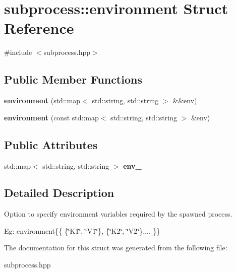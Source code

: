 \hypertarget{structsubprocess_1_1environment}{}\section{subprocess\+:\+:environment Struct Reference}
\label{structsubprocess_1_1environment}


{\ttfamily \#include $<$subprocess.\+hpp$>$}

\subsection*{Public Member Functions}
\begin{DoxyCompactItemize}
\item 
\mbox{\label{structsubprocess_1_1environment_af9a4b90871e4e6fd3a9249b9d20bdaff}} 
{\bfseries environment} (std\+::map$<$ std\+::string, std\+::string $>$ \&\&env)
\item 
\mbox{\label{structsubprocess_1_1environment_a3784ad2131faf4f4a41bfff7745c6b1b}} 
{\bfseries environment} (const std\+::map$<$ std\+::string, std\+::string $>$ \&env)
\end{DoxyCompactItemize}
\subsection*{Public Attributes}
\begin{DoxyCompactItemize}
\item 
\mbox{\label{structsubprocess_1_1environment_a93cbf888bcc52d15f1e06d1f7995f89c}} 
std\+::map$<$ std\+::string, std\+::string $>$ {\bfseries env\+\_\+}
\end{DoxyCompactItemize}


\subsection{Detailed Description}
Option to specify environment variables required by the spawned process.

Eg\+: environment\{\{ \{\char`\"{}\+K1\char`\"{}, \char`\"{}\+V1\char`\"{}\}, \{\char`\"{}\+K2\char`\"{}, \char`\"{}\+V2\char`\"{}\},... \}\} 

The documentation for this struct was generated from the following file\+:\begin{DoxyCompactItemize}
\item 
subprocess.\+hpp\end{DoxyCompactItemize}
